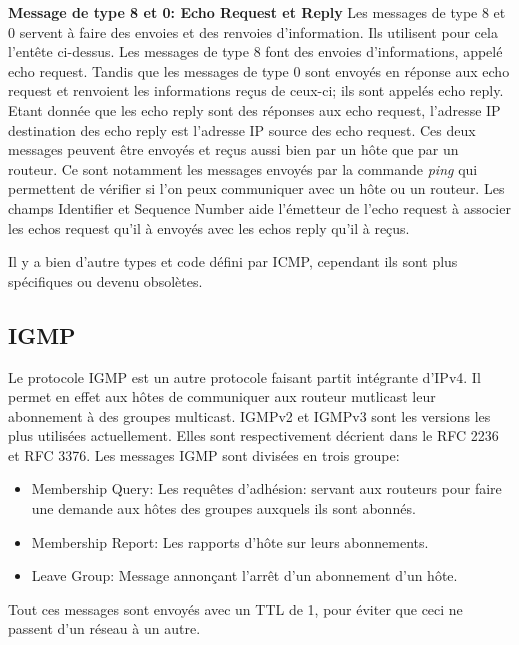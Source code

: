 \vspace{1cm}
\textbf{Message de type 8 et 0: Echo Request et Reply} Les messages de type 8
et 0 servent à faire des envoies et des renvoies d'information. Ils utilisent
pour cela l'entête ci-dessus. Les messages de type 8 font des envoies
d'informations, appelé echo request. Tandis que les messages de type 0 sont
envoyés en réponse aux echo request et renvoient les informations reçus de
ceux-ci; ils sont appelés echo reply. Etant donnée que les echo reply sont des
réponses aux echo request, l'adresse IP destination des echo reply est
l'adresse IP source des echo request. Ces deux messages peuvent être envoyés et
reçus aussi bien par un hôte que par un routeur. Ce sont notamment les messages
envoyés par la commande {\it ping} qui permettent de vérifier si l'on peux
communiquer avec un hôte ou un routeur.  Les champs Identifier et Sequence
Number aide l'émetteur de l'echo request à associer les echos request qu'il à
envoyés avec les echos reply qu'il à reçus.

\vspace{1cm}
Il y a bien d'autre types et code défini par ICMP, cependant ils sont plus
spécifiques ou devenu obsolètes.



\subsection{IGMP}
Le protocole IGMP est un autre protocole faisant partit intégrante d'IPv4. Il
permet en effet aux hôtes de communiquer aux routeur mutlicast leur abonnement
à des groupes multicast.  IGMPv2 et IGMPv3 sont les versions les plus utilisées
actuellement. Elles sont respectivement décrient dans le RFC
2236\cite{url-RFC-IGMP2} et RFC 3376\cite{url-RFC-IGMP3}.  Les messages IGMP
sont divisées en trois groupe:
\begin{itemize}
\item Membership Query: Les requêtes d'adhésion: servant aux routeurs pour
faire une demande aux hôtes des groupes auxquels ils sont abonnés.
\item Membership Report: Les rapports d'hôte sur leurs abonnements.
\item Leave Group: Message annonçant l'arrêt d'un abonnement d'un hôte.
\end{itemize}
Tout ces messages sont envoyés avec un TTL de 1, pour éviter que ceci ne
passent d'un réseau à un autre.

